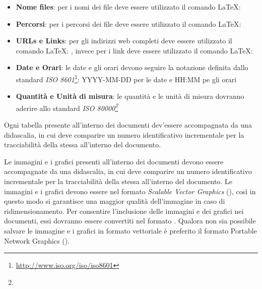 \documentclass[12pt,a4paper]{article}
\begin{document}
\begin{itemize}
  \item \textbf{Nome files}: per i nomi dei file deve essere utilizzato il comando \LaTeX: 
  \item  \textbf{Percorsi}: per i percorsi dei file deve essere utilizzato il comando \LaTeX: 
  \item \textbf{URLs e Links}:  per gli indirizzi web completi deve essere utilizzato il comando \LaTeX: , invece per i link deve essere utilizzato il comando \LaTeX: 
  \item \textbf{Date e Orari}: le date e gli orari devono seguire la notazione definita dallo standard \emph{ISO 8601}\footnote{\url{http://www.iso.org/iso/iso8601}}: YYYY-MM-DD per le date e HH:MM pe gli orari
  \item \textbf{Quantità e Unità di misura}: le quantità e le unità di misura dovranno aderire allo standard \emph{ISO 80000\footnote{}}
\end{itemize}

Ogni tabella presente all'interno dei documenti dev'essere accompagnata da una didascalia, in cui deve comparire un numero identificativo incrementale per la tracciabilità della stessa all'interno del documento.

Le immagini e i grafici presenti all'interno dei documenti devono essere accompagnate da una didascalia, in cui deve comparire un numero identificativo incrementale per la tracciabilità della stessa all'interno del documento. Le immagini e i grafici devono essere nel formato \emph{Scalable Vector Graphics} (), così in questo modo si garantisce una maggior qualità dell'immagine in caso di ridimensionamento. Per consentire l'inclusione delle immagini e dei grafici nei documenti, essi dovranno essere convertiti nel formato  . Qualora non sia possibile salvare le immagine e i grafici in formato vettoriale è preferito il formato Portable Network Graphics ().
\end{document}
